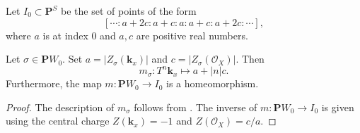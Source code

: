 \documentclass{amsart}
\begin{document}
Let \(I_0 \subset \mathbf{P}^S\) be the set of points of the form
\[ [\cdots : a+2c :a+c: a : a+c : a+2c :\cdots], \]
where \(a\) is at index 0 and \(a,c\) are positive real numbers.
\begin{proposition}
  Let \(\sigma \in \mathbf{P}W_0\).
  Set \(a = |Z_{\sigma}(\mathbf{k}_x)|\) and \(c = |Z_{\sigma}(\mathcal{O}_X)|\).
  Then
  \[ m_{\sigma} \colon T^{n} \mathbf{k}_x \mapsto a + |n| c.\]
  Furthermore, the map \(m \colon \mathbf{P}W_0 \to I_0\) is a homeomorphism.
\end{proposition}
\begin{proof}
  The description of \(m_{\sigma}\) follows from .
  The inverse of \(m \colon \mathbf{P}W_0 \to I_0\) is given using the central charge \(Z(\mathbf{k}_x) = -1\) and \(Z(\mathcal{O}_X) = c/a\).
\end{proof}
\end{document}

